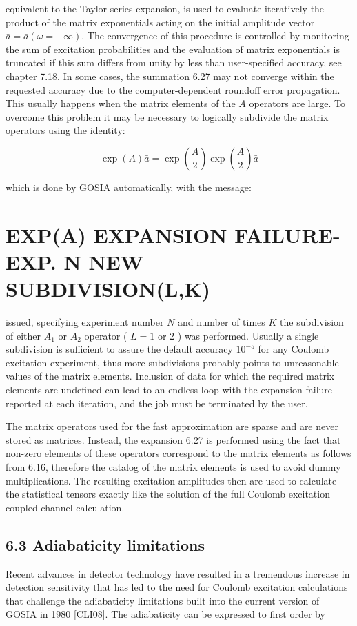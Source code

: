 \documentclass[10pt]{article}
\begin{document}
equivalent to the Taylor series expansion, is used to evaluate iteratively the product of the matrix exponentials acting on the initial amplitude vector $\bar{a}=\bar{a}(\omega=-\infty)$. The convergence of this procedure is controlled by monitoring the sum of excitation probabilities and the evaluation of matrix exponentials is truncated if this sum differs from unity by less than user-specified accuracy, see chapter 7.18. In some cases, the summation 6.27 may not converge within the requested accuracy due to the computer-dependent roundoff error propagation. This usually happens when the matrix elements of the $A$ operators are large. To overcome this problem it may be necessary to logically subdivide the matrix operators using the identity:


\begin{equation*}
\exp (A) \bar{a}=\exp \left(\frac{A}{2}\right) \exp \left(\frac{A}{2}\right) \bar{a} \tag{6.28}
\end{equation*}


which is done by GOSIA automatically, with the message:

\section*{EXP(A) EXPANSION FAILURE- EXP. N NEW SUBDIVISION(L,K)}
issued, specifying experiment number $N$ and number of times $K$ the subdivision of either $A_{1}$ or $A_{2}$ operator ( $L=1$ or 2 ) was performed. Usually a single subdivision is sufficient to assure the default accuracy $10^{-5}$ for any Coulomb excitation experiment, thus more subdivisions probably points to unreasonable values of the matrix elements. Inclusion of data for which the required matrix elements are undefined can lead to an endless loop with the expansion failure reported at each iteration, and the job must be terminated by the user.

The matrix operators used for the fast approximation are sparse and are never stored as matrices. Instead, the expansion 6.27 is performed using the fact that non-zero elements of these operators correspond to the matrix elements as follows from 6.16, therefore the catalog of the matrix elements is used to avoid dummy multiplications. The resulting excitation amplitudes then are used to calculate the statistical tensors exactly like the solution of the full Coulomb excitation coupled channel calculation.

\subsection*{6.3 Adiabaticity limitations}
Recent advances in detector technology have resulted in a tremendous increase in detection sensitivity that has led to the need for Coulomb excitation calculations that challenge the adiabaticity limitations built into the current version of GOSIA in 1980 [CLI08]. The adiabaticity can be expressed to first order by
\end{document}
